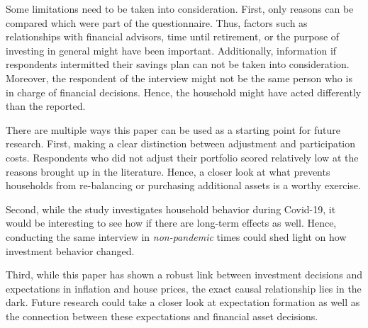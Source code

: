 \documentclass[ProjectABM]{subfiles}
\begin{document}
Some limitations need to be taken into consideration. First, only reasons can be compared which were part of the questionnaire. Thus, factors such as relationships with financial advisors, time until retirement, or the purpose of investing in general might have been important. Additionally, information if respondents intermitted their savings plan can not be taken into consideration. Moreover, the respondent of the interview might not be the same person who is in charge of financial decisions. Hence, the household might have acted differently than the reported.



There are multiple ways this paper can be used as a starting point for future research. First, making a clear distinction between adjustment and participation costs. Respondents who did not adjust their portfolio scored relatively low at the reasons brought up in the literature. Hence, a closer look at what prevents households from re-balancing or purchasing additional assets is a worthy exercise. 

Second, while the study investigates household behavior during Covid-19, it would be interesting to see how if there are long-term effects as well. Hence, conducting the same interview in \textit{non-pandemic} times could shed light on how investment behavior changed.%

Third, while this paper has shown a robust link between investment decisions and expectations in inflation and house prices, the exact causal relationship lies in the dark. Future research could take a closer look at expectation formation as well as the connection between these expectations and financial asset decisions.
\end{document}

